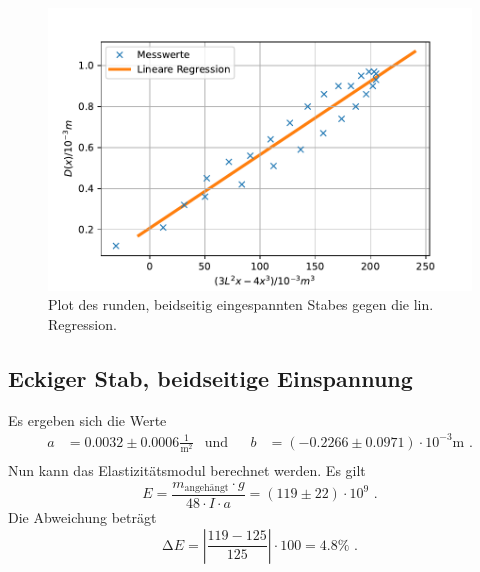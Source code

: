 \begin{figure}[H]
  \centering
  \includegraphics{pictures/Lineare Regression3.pdf}
  \caption{Plot des runden, beidseitig eingespannten Stabes gegen die lin. Regression.}
  \label{fig:plot3}
\end{figure}


\subsection{Eckiger Stab, beidseitige Einspannung}

Es ergeben sich die Werte 
\begin{align*}
  a &= 0.0032 ± 0.0006 \frac{1}{\unit{\meter\squared}} & \text{und}& & b&= (-0.2266 ± 0.0971) \cdot 10^{-3} \unit\meter \text{ .} \\
\end{align*}
Nun kann das Elastizitätsmodul berechnet werden. Es gilt
\begin{equation*}
  E = \frac{m_\text{angehängt} \cdot g}{48 \cdot I \cdot a} = (119 \pm 22) \cdot 10^{9} \text{ .}
\end{equation*}
Die Abweichung beträgt
\begin{equation*}
  \increment E = \left|\frac{119 - 125}{125}\right| \cdot 100 = 4.8 \% \text{ .}
\end{equation*}

